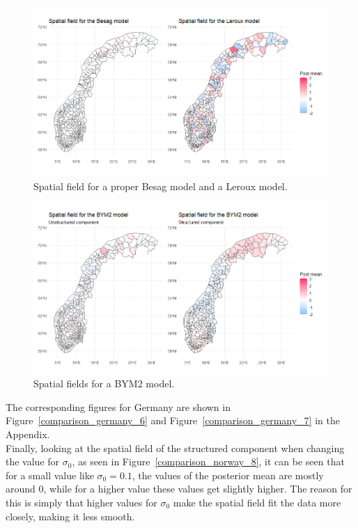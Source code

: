 \begin{figure}[H]
  \centering
  \includegraphics[width = \textwidth]{spatial_field_norway_1.png}
  \caption{Spatial field for a proper Besag model and a Leroux model.}
  \label{comparison_norway_6}
\end{figure}
\begin{figure}[H]
  \centering
  \includegraphics[width = \textwidth]{spatial_field_norway_2.png}
  \caption{Spatial fields for a BYM2 model.}
  \label{comparison_norway_7}
\end{figure}
The corresponding figures for Germany are shown in Figure~\ref{comparison_germany_6} and Figure~\ref{comparison_germany_7} in the Appendix. \\
Finally, looking at the spatial field of the structured component when changing the value for $\sigma_0$, as seen in Figure~\ref{comparison_norway_8}, it can be seen that for a small value like $\sigma_0 = 0.1$, the values of the posterior mean are mostly around 0, while for a higher value these values get slightly higher. The reason for this is simply that higher values for $\sigma_0$ make the spatial field fit the data more closely, making it less smooth.
